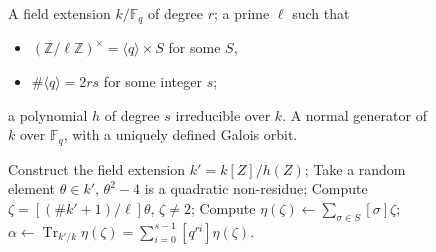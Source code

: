 \documentclass{mcom-l}
\theoremstyle{plain}
\theoremstyle{definition}
\DeclareMathOperator{\trace}{Tr} %
\newcommand{\Z}{\ensuremath{\mathbb{Z}}}
\newcommand{\F}{\ensuremath{\mathbb{F}}}
\newcounter{algorithm}
\begin{document}
\begin{figure}
\begin{algorithm}
  \label{algorithm:rains-conic}
  \begin{algorithmic}[1]
    \REQUIRE A field extension $k/\F_q$ of degree $r$; a prime $\ell$
    such that
    \begin{itemize}
    \item $(\Z/\ell\Z)^\times = \langle q\rangle \times S$ for some $S$,
    \item $\#\langle q\rangle = 2rs$ for some integer $s$;
    \end{itemize}
    a polynomial $h$ of degree $s$ irreducible over $k$.
    \ENSURE A normal generator of $k$ over $\F_q$,
    with a uniquely defined Galois orbit.
    
    \STATE Construct the field extension $k'=k[Z]/h(Z)$;
    \REPEAT
    \REPEAT
    \STATE Take a random element $\theta\in k'$,
    \UNTIL\label{algorithm:rains-conic:sqtest} $\theta^2-4$ is a quadratic non-residue;
    \STATE\label{algorithm:rains-conic:power} Compute $\zeta=[(\#k'+1)/\ell]\theta$,
    \UNTIL $\zeta\ne2$;
    \STATE\label{algorithm:rains-conic:period} Compute $\eta(\zeta) \leftarrow \sum_{\sigma\in S}[\sigma]\zeta$;
    \RETURN\label{algorithm:rains-conic:trace} $\alpha \leftarrow \trace_{k'/k}\eta(\zeta) = \sum_{i=0}^{s-1}[q^{ri}]\eta(\zeta)$.
  \end{algorithmic}
\end{algorithm}
\end{figure}
\end{document}
